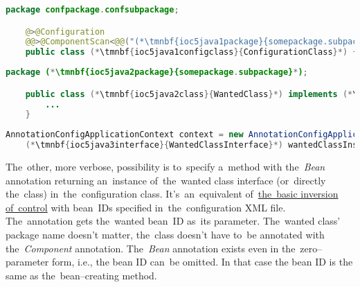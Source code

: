 \begin{lstlisting}[language=Java, title={Configuration class}]
    package confpackage.confsubpackage;

    @>@Configuration
    @@>@ComponentScan<@@("(*\tmnbf{ioc5java1package}{somepackage.subpackage}[ForestGreen]*)")
    public class (*\tmnbf{ioc5java1configclass}{ConfigurationClass}*) {}
\end{lstlisting}
\begin{lstlisting}[language=Java, title={Wanted class}]
    package (*\tmnbf{ioc5java2package}{somepackage.subpackage}*);

    public class (*\tmnbf{ioc5java2class}{WantedClass}*) implements (*\tmnbf{ioc5java2interface}{WantedClassInterface}*) {
        ...
    }
\end{lstlisting}
\begin{lstlisting}[language=Java, title={Usage}]
    AnnotationConfigApplicationContext context = new AnnotationConfigApplicationContext((*\tmnbf{ioc5java3configclass}{ConfigurationClass}*).class);
    (*\tmnbf{ioc5java3interface}{WantedClassInterface}*) wantedClassInstance = context.getBean("(*\tmnbf{ioc5java3beanid}{wantedClass}[ForestGreen]*)", (*\tmnbf{ioc5java3interface2}{WantedClassInterface}*).class);
\end{lstlisting}

\noindent The~other, more verbose, possibility is to~specify a~method with the~\textit{Bean} annotation returning an~instance of~the~wanted class interface (or~directly the~class) in~the~configuration class.
It's~an~equivalent of~\hyperref[springinversionofcontrol]{the~basic inversion of~control} with bean~IDs specified in~the~configuration XML file.
The~annotation gets the~wanted bean~ID as~its parameter.
The~wanted class' package name doesn't matter, the~class doesn't have to~be annotated with the~\textit{Component} annotation.
The~\textit{Bean} annotation exists even in the~zero--parameter form, i.e., the bean ID can~be omitted.
In that case the bean ID is the same as the~bean--creating method.
\newpage

